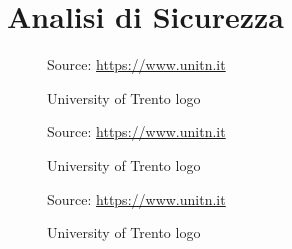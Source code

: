 \chapter{Analisi di Sicurezza}
\label{cha:analysis}

\begin{figure}[htbp]
  \centering
  \def\stackalignment{r} %
  {\scriptsize Source: \url{https://www.unitn.it} }
  \caption{University of Trento logo}
  \label{fig:unitn}
\end{figure}

\begin{figure} %
  \centering
  \def\stackalignment{r} %
  {\scriptsize \parbox[t]{\linewidth}{ Source: \url{https://www.unitn.it}} }
  \caption{University of Trento logo}
  \label{fig:unitn_wrapfigure_right}
\end{figure}

\lipsum[1]

\begin{figure}
  \centering
  \def\stackalignment{l} %
  {\scriptsize \parbox[t]{\linewidth}{ Source: \url{https://www.unitn.it}} }
  \caption{University of Trento logo}
  \label{fig:unitn_wrapfigure_left}
\end{figure}

\lipsum[1]
